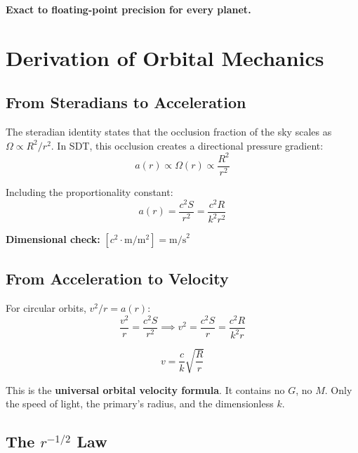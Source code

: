 \textbf{Exact to floating-point precision for every planet.}


\section{Derivation of Orbital Mechanics}

\subsection{From Steradians to Acceleration}

The steradian identity states that the occlusion fraction of the sky scales as $\Omega \propto R^2/r^2$.  In SDT, this occlusion creates a directional pressure gradient:
\begin{equation}
  a(r) \propto \Omega(r) \propto \frac{R^2}{r^2}
\end{equation}

Including the proportionality constant:
\begin{equation}\label{eq:accel}
  a(r) = \frac{c^2 S}{r^2} = \frac{c^2 R}{k^2 r^2}
\end{equation}

\textbf{Dimensional check:} $[c^2 \cdot \text{m} / \text{m}^2] = \text{m/s}^2$ \checkmark

\subsection{From Acceleration to Velocity}

For circular orbits, $v^2/r = a(r)$:
\begin{equation}
  \frac{v^2}{r} = \frac{c^2 S}{r^2} \implies v^2 = \frac{c^2 S}{r} = \frac{c^2 R}{k^2 r}
\end{equation}

\begin{equation}\label{eq:v-orbital}
  \boxed{v = \frac{c}{k}\sqrt{\frac{R}{r}}}
\end{equation}

This is the \textbf{universal orbital velocity formula}.  It contains no $G$, no $M$.  Only the speed of light, the primary's radius, and the dimensionless $k$.

\subsection{The $r^{-1/2}$ Law}

